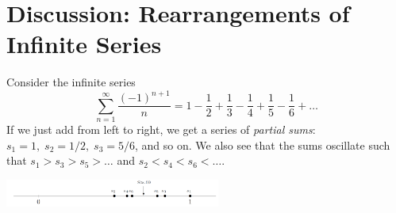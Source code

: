 \section{Discussion: Rearrangements of Infinite Series}
    Consider the infinite series
    \begin{equation*}
        \sum_{n=1}^\infty\frac{(-1)^{n+1}}{n} = 1 - \frac{1}{2} + \frac{1}{3} - \frac{1}{4} + \frac{1}{5} - \frac{1}{6} + \dots 
    \end{equation*}
    If we just add from left to right, we get a series of \textit{partial sums}: $s_1 = 1,\; s_2 = 1/2,\; s_3 = 5/6$, and so on. We also see that the sums oscillate such that $s_1 > s_3 > s_5 > \dots$ and $s_2 < s_4 < s_6 < \dots$.
    \begin{center}
        \includegraphics[width=200pt]{oscillating_converging.png}
    \end{center}
    
    